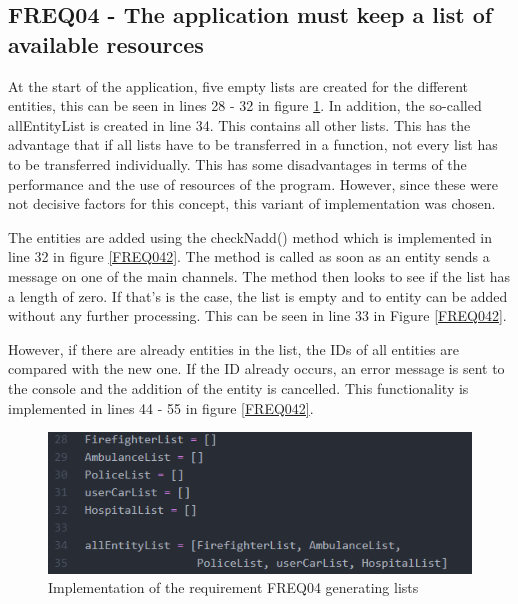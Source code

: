 \subsection{FREQ04 - The application must keep a list of available resources}

At the start of the application, five empty lists are created for the different entities, this can be seen in lines 28 - 32 in figure \ref{FREQ041}. In addition, the so-called allEntityList is created in line 34. This contains all other lists. This has the advantage that if all lists have to be transferred in a function, not every list has to be transferred individually. This has some disadvantages in terms of the performance and the use of resources of the program. However, since these were not decisive factors for this concept, this variant of implementation was chosen. 

The entities are added using the checkNadd() method which is implemented in line 32 in figure \ref{FREQ042}. The method is called as soon as an entity sends a message on one of the main channels. The method then looks to see if the list has a length of zero. If that's is the case, the list is empty and to entity can be added without any further processing. This can be seen in line 33 in Figure \ref{FREQ042}. 

However, if there are already entities in the list, the IDs of all entities are compared with the new one. If the ID already occurs, an error message is sent to the console and the addition of the entity is cancelled. This functionality is implemented in lines 44 - 55 in figure \ref{FREQ042}.


\begin{figure}
\sidecaption
\includegraphics[scale=0.4]{images/walter/code/FREQ04-00.png}
\caption{Implementation of the requirement FREQ04 generating lists}
\label{FREQ041}
\end{figure}

